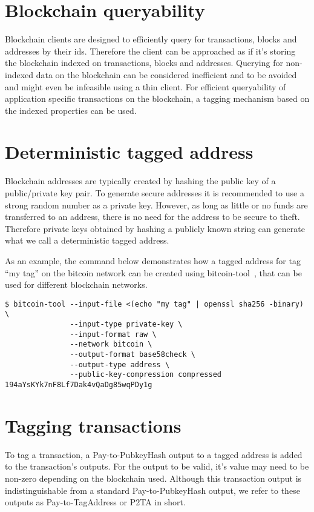 \documentclass[a4paper,10pt]{article}
\begin{document}
\section{Blockchain queryability}
Blockchain clients are designed to efficiently query for transactions, blocks and addresses by their ids.
Therefore the client can be approached as if it's storing the blockchain indexed on transactions, blocks and addresses.
Querying for non-indexed data on the blockchain can be considered inefficient and to be avoided and might even be infeasible using a thin client.
For efficient queryability of application specific transactions on the blockchain, a tagging mechanism based on the indexed properties can be used.

\section{Deterministic tagged address}
\label{sec:taggedaddress}
Blockchain addresses are typically created by hashing the public key of a public/private key pair.
To generate secure addresses it is recommended to use a strong random number as a private key.
However, as long as little or no funds are transferred to an address, there is no need for the address to be secure to theft.
Therefore private keys obtained by hashing a publicly known string can generate what we call a deterministic tagged address.

As an example, the command below demonstrates how a tagged address for tag ``my tag'' on the bitcoin network can be created using bitcoin-tool~\cite{Matja}, that can be used for different blockchain networks.
\begin{small}\begin{verbatim}
$ bitcoin-tool --input-file <(echo "my tag" | openssl sha256 -binary) \
               --input-type private-key \
               --input-format raw \
               --network bitcoin \
               --output-format base58check \
               --output-type address \
               --public-key-compression compressed
194aYsKYk7nF8Lf7Dak4vQaDg85wqPDy1g
\end{verbatim}\end{small}

\section{Tagging transactions}
To tag a transaction, a Pay-to-PubkeyHash output to a tagged address is added to the transaction's outputs.
For the output to be valid, it's value may need to be non-zero depending on the blockchain used.
Although this transaction output is indistinguishable from a standard Pay-to-PubkeyHash output, we refer to these outputs as Pay-to-TagAddress or P2TA in short.
\end{document}
